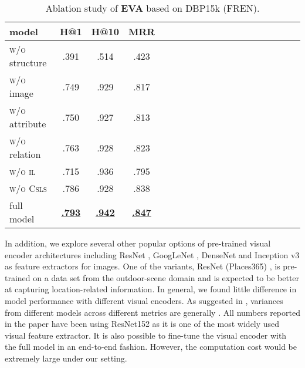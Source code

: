 \documentclass[letterpaper]{article} \usepackage{aaai21}  \usepackage{times}  \usepackage{helvet} \usepackage{courier}  \usepackage[hyphens]{url}  \usepackage{graphicx} \urlstyle{rm} \def\UrlFont{\rm}  \usepackage{natbib}  \usepackage{caption} \frenchspacing  \setlength{\pdfpagewidth}{8.5in}  \setlength{\pdfpageheight}{11in}
\newcommand{\modelname}[0]{\textbf{\textsc{EVA}}\xspace}
\begin{document}
\begin{table}[!t]
\small
\renewcommand{\arraystretch}{0.9}
\caption{\small{Ablation study of \modelname based on DBP15k (FREN).}}
\label{tab:ablation_study}
\centering
\begin{tabular}{lcccccccccccccccccc}
\toprule
model & \scriptsize  H@1 & \scriptsize H@10 & \scriptsize MRR \\
\midrule
\textsc{w/o} structure & .391 \scriptsize & .514 \scriptsize & .423 \scriptsize \\
\textsc{w/o} image & .749 \scriptsize & .929 \scriptsize & .817 \scriptsize \\
\textsc{w/o} attribute & .750 \scriptsize &.927 \scriptsize & .813 \scriptsize \\
\textsc{w/o} relation & .763 \scriptsize & .928 \scriptsize & .823 \scriptsize  \\
\midrule 
  \textsc{w/o il}  & .715 \scriptsize & .936 \scriptsize & .795 \scriptsize \\
 \textsc{w/o Csls} & .786 \scriptsize & .928 \scriptsize & .838 \scriptsize \\
\midrule
full model & \underline{\textbf{\textbf{.793}}} \scriptsize & \underline{\textbf{\textbf{.942}}} \scriptsize & \underline{\textbf{\textbf{.847}}} \scriptsize \\
\bottomrule
\end{tabular}
\end{table}






In addition, we explore several other popular options of pre-trained visual encoder architectures including ResNet \citep{he2016deep}, GoogLeNet \citep{szegedy2015going}, DenseNet \citep{huang2017densely} and Inception v3 \citep{szegedy2016rethinking} as feature extractors for images. One of the variants, ResNet (Places365) \citep{zhou2017places}, is pre-trained on a data set from the outdoor-scene domain and is expected to be better at capturing location-related information. In general, we found little difference in model performance with different visual encoders. As suggested in , variances from different models across different metrics are generally . All numbers reported in the paper have been using ResNet152 as it is one of the most widely used visual feature extractor. It is also possible to fine-tune the visual encoder with the full model in an end-to-end fashion. However, the computation cost would be extremely large under our setting.
\end{document}
